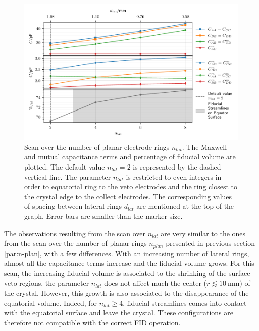 \begin{figure}
\centering
\includegraphics[scale=1]{Figures/ElectrodesScan/capacitance_fiducial_n_lat.pdf}
\caption{Scan over the number of planar electrode rings $n_{lat}$. The Maxwell and mutual capacitance terms and percentage of fiducial volume are plotted. The default value $n_{lat}=2$ is represented by the dashed vertical line. The parameter $n_{lat}$ is restricted to even integers in order to equatorial ring to the veto electrodes and the ring closest to the crystal edge to the collect electrodes. The corresponding values of spacing between lateral rings $d_{lat}$ are mentioned at the top of the graph. Error bars are smaller than the marker size.}
\label{fig:capacitance-fiducial-n-lat}
\end{figure}

The observations resulting from the scan over $n_{lat}$ are very similar to the ones from the scan over the number of planar rings $n_{plan}$ presented in previous section \ref{par:n-plan}, with a few differences. With an increasing number of lateral rings, almost all the capacitance terms increase and the fiducial volume grows.
For this scan, the increasing fiducial volume is associated to the shrinking of the surface veto regions, the parameter $n_{lat}$ does not affect much the center ($r\lesssim\SI{10}{\mm}$) of the crystal. However, this growth is also associated to the disappearance of the equatorial volume. Indeed, for $n_{lat} \geq 4$, fiducial streamlines comes into contact with the equatorial surface and leave the crystal. These configurations are therefore not compatible with the correct FID operation.

